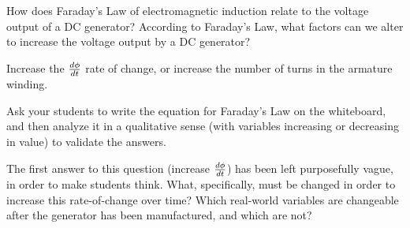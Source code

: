 

How does Faraday's Law of electromagnetic induction relate to the voltage output of a DC generator?  According to Faraday's Law, what factors can we alter to increase the voltage output by a DC generator?







Increase the ${d\phi \over dt}$ rate of change, or increase the number of turns in the armature winding.







Ask your students to write the equation for Faraday's Law on the whiteboard, and then analyze it in a qualitative sense (with variables increasing or decreasing in value) to validate the answers.

The first answer to this question (increase ${d\phi \over dt}$) has been left purposefully vague, in order to make students think.  What, specifically, must be changed in order to increase this rate-of-change over time?  Which real-world variables are changeable after the generator has been manufactured, and which are not?




